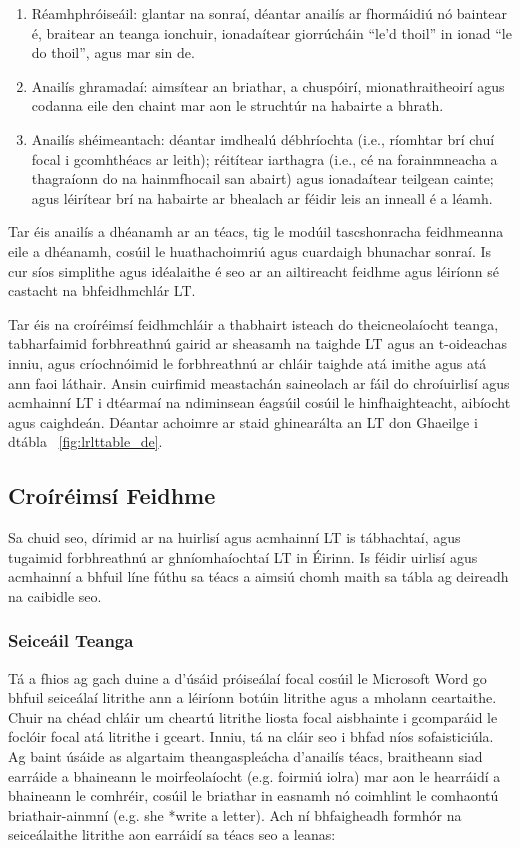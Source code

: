 \documentclass[]{../../metanetpaper}
\begin{document}
\begin{multicols}{2}
\begin{enumerate}
\item Réamhphróiseáil: glantar na sonraí, déantar anailís ar fhormáidiú nó baintear é, braitear an teanga ionchuir, ionadaítear giorrúcháin ``le'd thoil'' in ionad ``le do thoil'', agus mar sin de.
\item Anailís ghramadaí: aimsítear an briathar, a chuspóirí, mionathraitheoirí agus codanna eile den chaint mar aon le struchtúr na habairte a bhrath.
\item Anailís shéimeantach: déantar imdhealú débhríochta (i.e., ríomhtar brí chuí focal i gcomhthéacs ar leith); réitítear iarthagra (i.e., cé na forainmneacha a thagraíonn do na hainmfhocail san abairt) agus ionadaítear teilgean cainte; agus léirítear brí na habairte ar bhealach ar féidir leis an inneall é a léamh.
\end{enumerate}

Tar éis anailís a dhéanamh ar an téacs, tig le modúil tascshonracha feidhmeanna eile a dhéanamh, cosúil le huathachoimriú agus cuardaigh bhunachar sonraí. Is cur síos simplithe agus idéalaithe é seo ar an ailtireacht feidhme agus léiríonn sé castacht na bhfeidhmchlár LT.  

Tar éis na croíréimsí feidhmchláir a thabhairt isteach do theicneolaíocht teanga, tabharfaimid forbhreathnú gairid ar sheasamh na taighde LT agus an t-oideachas inniu, agus críochnóimid le forbhreathnú ar chláir taighde atá imithe agus atá ann faoi láthair. Ansin cuirfimid meastachán saineolach ar fáil do chroíuirlisí agus acmhainní LT i dtéarmaí na ndiminsean éagsúil cosúil le hinfhaighteacht, aibíocht agus caighdeán. Déantar achoimre ar staid ghinearálta an LT don Ghaeilge i dtábla ~\ref{fig:lrlttable_de}.


\subsection{Croíréimsí Feidhme} 

Sa chuid seo, dírimid ar na huirlisí agus acmhainní LT is tábhachtaí, agus tugaimid forbhreathnú ar ghníomhaíochtaí LT in Éirinn. Is féidir uirlisí agus acmhainní a bhfuil líne fúthu sa téacs a aimsiú chomh maith sa tábla ag deireadh na caibidle seo. 

\subsubsection{Seiceáil Teanga}

Tá a fhios ag gach duine a d’úsáid próiseálaí focal cosúil le Microsoft Word go bhfuil seiceálaí litrithe ann a léiríonn botúin litrithe agus a mholann ceartaithe. Chuir na chéad chláir um cheartú litrithe liosta focal aisbhainte i gcomparáid le foclóir focal atá litrithe i gceart. Inniu, tá na cláir seo i bhfad níos sofaisticiúla. Ag baint úsáide as algartaim theangaspleácha d’anailís téacs, braitheann siad earráide a bhaineann le moirfeolaíocht (e.g. foirmiú iolra) mar aon le hearráidí a bhaineann le comhréir, cosúil le briathar in easnamh nó coimhlint le comhaontú briathair-ainmní (e.g. she *write a letter). Ach ní bhfaigheadh formhór na seiceálaithe litrithe aon earráidí sa téacs seo \cite{zar1} a leanas: 


\end{multicols}
\end{document}
